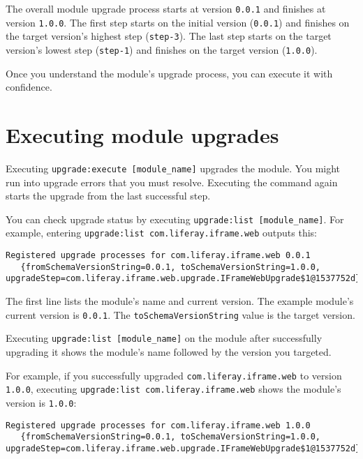 The overall module upgrade process starts at version \texttt{0.0.1} and
finishes at version \texttt{1.0.0}. The first step starts on the initial
version (\texttt{0.0.1}) and finishes on the target version's highest
step (\texttt{step-3}). The last step starts on the target version's
lowest step (\texttt{step-1}) and finishes on the target version
(\texttt{1.0.0}).

Once you understand the module's upgrade process, you can execute it
with confidence.

\section{Executing module upgrades}\label{executing-module-upgrades}

Executing \texttt{upgrade:execute\ {[}module\_name{]}} upgrades the
module. You might run into upgrade errors that you must resolve.
Executing the command again starts the upgrade from the last successful
step.

You can check upgrade status by executing
\texttt{upgrade:list\ {[}module\_name{]}}. For example, entering
\texttt{upgrade:list\ com.liferay.iframe.web} outputs this:

\begin{verbatim}
Registered upgrade processes for com.liferay.iframe.web 0.0.1
   {fromSchemaVersionString=0.0.1, toSchemaVersionString=1.0.0, upgradeStep=com.liferay.iframe.web.upgrade.IFrameWebUpgrade$1@1537752d}
\end{verbatim}

The first line lists the module's name and current version. The example
module's current version is \texttt{0.0.1}. The
\texttt{toSchemaVersionString} value is the target version.

Executing \texttt{upgrade:list\ {[}module\_name{]}} on the module after
successfully upgrading it shows the module's name followed by the
version you targeted.

For example, if you successfully upgraded
\texttt{com.liferay.iframe.web} to version \texttt{1.0.0}, executing
\texttt{upgrade:list\ com.liferay.iframe.web} shows the module's version
is \texttt{1.0.0}:

\begin{verbatim}
Registered upgrade processes for com.liferay.iframe.web 1.0.0
   {fromSchemaVersionString=0.0.1, toSchemaVersionString=1.0.0, upgradeStep=com.liferay.iframe.web.upgrade.IFrameWebUpgrade$1@1537752d}
\end{verbatim}

